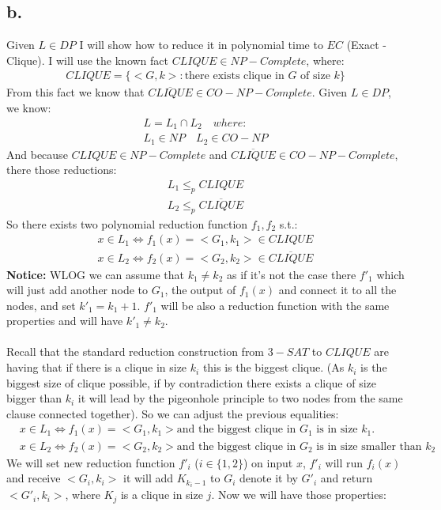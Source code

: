 \documentclass[11pt]{article}
\theoremstyle{plain}
\theoremstyle{nonumberplainnobrackets}
\begin{document}
\subsection*{b. } Given $L\in DP$ I will show how to reduce it in polynomial time to $EC$ (Exact -Clique). I will use the known fact $CLIQUE\in NP-Complete$, where:
\begin{align*}
CLIQUE = \{ <G,k> : \text{there exists clique in } G \text{ of size } k \}
\end{align*}
From this fact we know that $\overline{CLIQUE}\in CO-NP-Complete$.
Given $L\in DP$, we know:
\begin{align*}
L = L_1\cap L_2\quad  where:\\
L_1\in NP\quad L_2\in CO-NP
\end{align*}
And because $CLIQUE\in NP-Complete$ and $\overline{CLIQUE}\in CO-NP-Complete$, there those reductions:
\begin{align*}
L_1 \le_p CLIQUE \\
L_2 \le_p \overline{CLIQUE}
\end{align*}
So there exists two polynomial reduction function $f_1,f_2$ s.t.:
\begin{align*}
x\in L_1 \iff f_1(x)=<G_1,k_1> \in CLIQUE \\
x \in L_2 \iff f_2(x)=<G_2,k_2> \in \overline{CLIQUE}
\end{align*}
\textbf{Notice: } WLOG we can assume that $k_1 \ne k_2$ as if it's not the case there $f'_1$ which will just add another node to $G_1$, the output of $f_1(x)$ and connect it to all the nodes, and set $k'_1 = k_1 +1$. $f'_1$ will be also a reduction function with the same properties and will have $k'_1 \ne k_2$.\\ \\
Recall that the standard reduction construction from $3-SAT$ to $CLIQUE$ are having that if there is a clique in size $k_i$ this is the biggest clique. (As $k_i$ is the biggest size of clique possible, if by contradiction there exists a clique of size bigger than $k_i$ it will lead by the pigeonhole principle to two nodes from the same clause connected together). So we can adjust the previous equalities:
\begin{align*}
&x\in L_1 \iff f_1(x)=<G_1,k_1> \text{and the biggest clique in }G_1\text{ is in size }k_1. \\
&x \in L_2 \iff f_2(x)=<G_2,k_2> \text{and the biggest clique in } G_2 \text{ is in size smaller than } k_2
\end{align*}
We will set new reduction function $f'_i$ ($i\in \{1,2 \}$) on input $x$, $f'_i$ will run $f_i(x)$ and receive $<G_i,k_i>$ it will add $K_{{k_i}-1}$ to $G_i$ denote it by $G'_i$ and return $<G'_i,k_i>$, where $K_j$ is a clique in size $j$. Now we will have those properties: 
\end{document}
